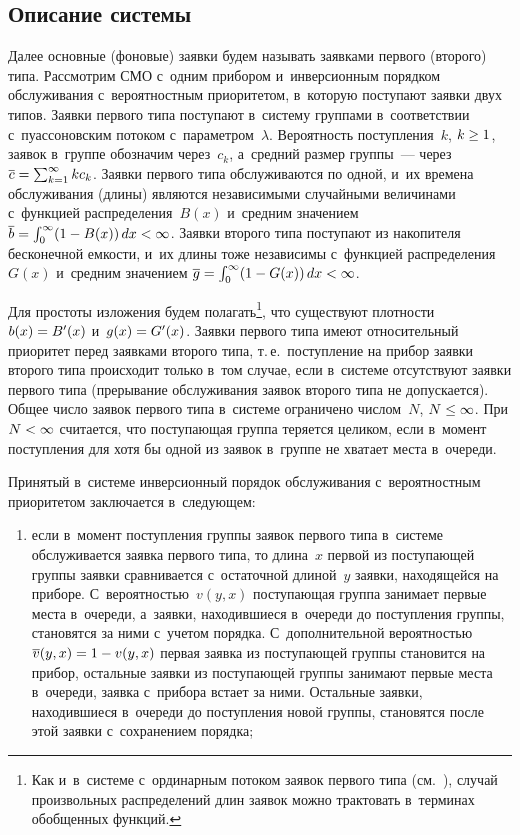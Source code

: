 \begin{multicols}{2}
\section{Описание системы}
\vspace*{-2pt}

Далее основные (фоновые) заявки будем называть заявками первого (второго) 
типа. Рассмотрим СМО %
с~одним прибором 
и~инверсионным порядком обслуживания с~вероятностным приоритетом,
в~которую поступают заявки двух типов. Заявки первого типа поступают в~систему 
группами в~соответствии с~пуассоновским потоком с~параметром~$\lambda$.
Вероятность поступления~$k$, $k\hm\ge 1$, заявок в~группе обозначим через~$c_k$, 
а~средний размер группы~--- через $\overline{c}\hm= \sum\nolimits_{k=1}^\infty k c_k$. 
Заявки первого типа обслуживаются по одной, и~их времена обслуживания (длины) 
являются независимыми случайными величинами с~функцией распределения~$B(x)$ 
и~средним значением $\overline{b} \hm=\int\nolimits_0^\infty (1-B(x))\,dx \hm< \infty$. 
Заявки второго типа поступают из накопителя бесконечной емкости, и~их 
длины тоже независимы с~функцией распределения~$G(x)$ и~средним 
значением $\overline{g}\hm=\int\nolimits_0^\infty (1-G(x))\, dx \hm< \infty$. 

Для простоты изложения будем полагать\footnote{Как и~в~системе с~ординарным 
потоком заявок первого типа (см.~\cite{new1}), случай произвольных распределений 
длин заявок можно трактовать в~терминах обобщенных функций.}, 
что существуют плотности $b(x)\hm=B'(x)$ и~$g(x)\hm=G'(x)$.
Заявки первого типа имеют относительный приоритет перед заявками второго типа, 
т.\,е.\ поступление на прибор заявки второго типа происходит только в~том случае, 
если в~системе отсутствуют заявки первого типа (прерывание обслуживания заявок 
второго типа не допускается). Общее число заявок первого типа в~системе 
ограничено числом~$N$, $N\hm\le\infty$. При $N\hm<\infty$ считается, что 
поступающая группа теряется целиком, если в~момент поступления для хотя бы 
одной из заявок в~группе не хватает места в~очереди.

Принятый в~системе инверсионный порядок обслуживания с~вероятностным 
приоритетом заключается в~следующем:
\begin{enumerate}[(1)]
\item если в~момент поступления группы заявок первого типа в~системе 
обслуживается заявка первого типа, то длина~$x$ первой из по\-сту\-па\-ющей 
группы заявки сравнивается с~остаточной длиной~$y$ заявки, 
находящейся на приборе. С~вероятностью~$v(y,x)$ поступающая 
группа занимает первые места в~очереди, а~заявки, находившиеся в~очереди 
до поступления группы, становятся за ними с~учетом порядка. 
С~дополнительной вероятностью $\overline{v}(y,x)\hm=1\hm-v(y,x)$ 
первая заявка из поступающей группы становится на прибор, остальные 
заявки из поступающей группы занимают первые места в~очереди, заявка с~прибора 
встает за ними. Остальные заявки, находившиеся в~очереди до поступления 
новой группы, становятся после этой заявки с~сохранением порядка;


\end{enumerate}
\end{multicols}
